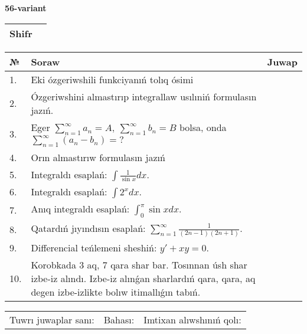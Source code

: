\documentclass{article}
\begin{document}
  \egroup
  
  \newpage
  
  
  \textbf{56-variant}\\
  
  \bgroup
  \def\arraystretch{1.6} %
  
  \begin{tabular}{|m{5.7cm}|m{9.5cm}|}
  \hline
  Shifr & \\
  \hline
  \end{tabular}
  
  \vspace{1cm}
  
  \begin{tabular}{|m{0.7cm}|m{10cm}|m{4cm}|}
  \hline
  № & Soraw & Juwap \\
  \hline
  1. & Eki ózgeriwshili funkciyanıń tolıq ósimi &  \\
  \hline
  2. & Ózgeriwshini almastırıp integrallaw usılıniń formulasın jazıń. &  \\
  \hline
  3. & Eger \(\sum_{n = 1}^{\infty}a_{n} = A,\ \sum_{n = 1}^{\infty}b_{n} = B\) bolsa, onda \(\sum_{n = 1}^{\infty}\left( a_{n} - b_{n} \right) = ?\) &  \\
  \hline
  4. & Orın almastırıw formulasın jazıń &  \\
  \hline
  5. & Integraldı esaplań: \(\int{\frac{1}{\sin x}dx}\). &  \\
  \hline
  6. & Integraldı esaplań: \(\int{2^{x}dx}\). &  \\
  \hline
  7. & Anıq integraldı esaplań: \(\int_{0}^{\pi}{\sin xdx}\). &  \\
  \hline
  8. & Qatardıń jıyındısın esaplań: \(\sum_{n = 1}^{\infty}\frac{1}{(2n - 1)(2n + 1)}\). &  \\
  \hline
  9. & Differencial teńlemeni sheshiń: \(y' + xy = 0\). &  \\
  \hline
  10. & Korobkada 3 aq, 7 qara shar bar. Tosınnan úsh shar izbe-iz alındı. Izbe-iz alınǵan sharlardıń qara, qara, aq degen izbe-izlikte bolıw itimallıǵın tabıń. &  \\
  \hline
  \end{tabular}
  
  \vspace{1cm}
  
  \begin{tabular}{lll}
  Tuwrı juwaplar sanı: \underline{\hspace{1.5cm}} & 
  Bahası: \underline{\hspace{1.5cm}} & 
  Imtixan alıwshınıń qolı: \underline{\hspace{2cm}} \\
  \end{tabular}
  
\end{document}
